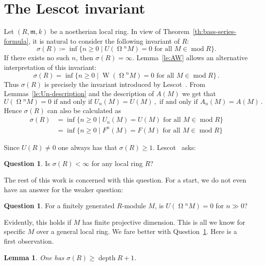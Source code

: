 \documentclass{amsart}
\numberwithin{equation}{section}
\theoremstyle{plain}
\newtheorem{lemma}[equation]{Lemma}
\theoremstyle{definition}
\newtheorem{question}[equation]{Question}
\theoremstyle{remark}
\newcommand{\depth}{\operatorname{depth}}
\newcommand{\lescot}{\operatorname{W}}
\newcommand{\rmod}{\operatorname{mod}}
\newcommand{\syz}{\operatorname{\Omega}\!}
\newcommand{\fm}{\mathfrak{m}}
\begin{document}
\section{The Lescot invariant}
\label{se:sigma}
Let $(R,\fm,k)$ be a noetherian local ring. In view of Theorem~\ref{th:bass-series-formula}, it is natural to consider the following invariant of $R$:
\begin{equation}
\label{eq:sigma-defn}    
\sigma(R)\coloneqq\inf\{n\ge 0\mid U(\syz^nM)=0
        \text{~for all $M \in \rmod R$}\}.
\end{equation}  
If there exists no such $n$, then $\sigma(R)=\infty$. Lemma~\ref{le:AW} allows an alternative interpretation of this invariant:
\[
\sigma(R)=\inf\{n\ge 0\mid \lescot(\syz^nM)=0\text{ for all $M\in\rmod R$}\} \,.   
\]
Thus $\sigma(R)$ is precisely the invariant introduced by Lescot~\cite{Lescot:1986}.  From Lemmas~\ref{le:Un-description} and the description of $A(M)$ we get that
    \[
    U(\syz^nM)=0\text{ if and only if } U_n(M)=U(M)\,, 
        \text{ if and only if } A_n(M)=A(M)\,.
    \]
    Hence $\sigma(R)$ can also be calculated as 
    \begin{equation}
    \label{eq:sigma-equivalent}
    \begin{aligned}
    \sigma(R) 
    & =\inf\{n\geq 0\mid U_{n}(M)=U(M) \text{ for all $M\in\rmod R$} \} \\
    & =\inf\{n\geq 0 \mid {F}^{n}(M)=F(M) \text{ for all $M\in\rmod R$} \} 
    \end{aligned}
    \end{equation}

Since $U(R)\neq 0$ one always has that $\sigma(R)\geq 1$. Lescot~\cite{Lescot:1986} asks:
\begin{question}
\label{qu:lescot}
    Is $\sigma(R)<\infty$ for any local ring $R$?
\end{question}
The rest of this work is concerned with this question. For a start, we do not even have an answer for the weaker question:

\begin{question}
\label{qu:lescotM}
For a finitely generated $R$-module $M$, is $U(\syz^nM)=0$ for $n\gg 0$?
\end{question}

Evidently, this holds if $M$ has finite projective dimension. This is all we know for specific $M$ over a general local ring. 
We fare better with Question~\ref{qu:lescot}. Here is a first observation.

 \begin{lemma}
 \label{le:sigma-depth}
     One  has $\sigma(R)\ge \depth R+1$.
 \end{lemma}
\end{document}
